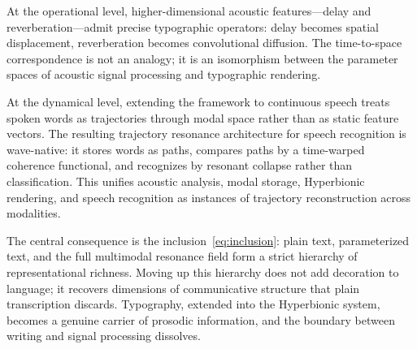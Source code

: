 \documentclass[12pt, a4paper]{article}
\begin{document}
At the operational level, higher-dimensional acoustic features---delay and reverberation---admit precise typographic operators: delay becomes spatial displacement, reverberation becomes convolutional diffusion. The time-to-space correspondence is not an analogy; it is an isomorphism between the parameter spaces of acoustic signal processing and typographic rendering.

At the dynamical level, extending the framework to continuous speech treats spoken words as trajectories through modal space rather than as static feature vectors. The resulting trajectory resonance architecture for speech recognition is wave-native: it stores words as paths, compares paths by a time-warped coherence functional, and recognizes by resonant collapse rather than classification. This unifies acoustic analysis, modal storage, Hyperbionic rendering, and speech recognition as instances of trajectory reconstruction across modalities.

The central consequence is the inclusion~\eqref{eq:inclusion}: plain text, parameterized text, and the full multimodal resonance field form a strict hierarchy of representational richness. Moving up this hierarchy does not add decoration to language; it recovers dimensions of communicative structure that plain transcription discards. Typography, extended into the Hyperbionic system, becomes a genuine carrier of prosodic information, and the boundary between writing and signal processing dissolves.
\end{document}

